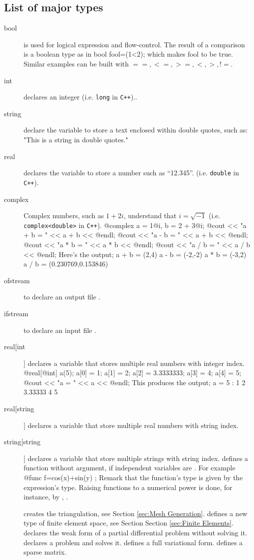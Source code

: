 \documentclass[a4paper,twoside,12pt]{book}
\def\refSec#1{Section \ref{sec:#1}}
\begin{document}
\subsection{List of major types}
\begin{description}
\item[bool]   is used for logical expression and flow-control.  The result of a
comparison is a boolean type as in
\bFF
bool fool=(1<2);
\eFF
which makes fool to be true.  Similar examples can be built with $==,<=,>=,<,>,!=$.
\item[int]
  declares an integer (i.e. \texttt{long} in \texttt{C++})..
\item[string] declare the variable to store
a text enclosed within double quotes, such as:
\bFF
"This is a string in double quotes."
\eFF
{}
\item[real] declares the variable to store a number such as ``12.345''.  (i.e. \texttt{double} in \texttt{C++}).
\item[complex]  Complex numbers, such as
$1+2i$, \freefempp understand that $i=\sqrt{-1}$ (i.e. \texttt{complex<double>} in \texttt{C++}).
\bFF
@complex a =  1@i, b = 2 + 3@i;
@cout << "a + b = " << a + b << @endl;
@cout << "a - b = " << a + b << @endl;
@cout << "a * b = " << a * b << @endl;
@cout << "a / b = " << a / b << @endl;
\eFF
Here's the output;
\bFF
a + b = (2,4)
a - b = (-2,-2)
a * b = (-3,2)
a / b = (0.230769,0.153846)
\eFF
\item[ofstream]  to declare an output file .
\item[ifstream]   to declare an input file .

\item[real[int]]  declares a variable that stores multiple
real numbers with integer index.
\bFF
@real[@int] a(5);
a[0] = 1; a[1] = 2; a[2] = 3.3333333; a[3] = 4; a[4] = 5;
@cout << "a = " << a  << @endl;
\eFF
This produces the output;
\bFF
a = 5   :
  1       2     3.33333   4       5
\eFF
\item[real[string]]  declares a variable that store multiple
real numbers with string index.
\item[string[string]]  declares a variable that store multiple
strings with string index.
\itemtt[func] defines a function without argument,
if independent variables are .
For example
\bFF
@func f=cos(x)+sin(y) ;
\eFF
{}
Remark that the function's type is given by the expression's type.
Raising functions to a numerical power is done, for instance, by
, .

\itemtt[mesh]  
creates the triangulation, see \refSec{Mesh Generation}.
\itemtt[fespace]
defines a new type of finite element space, see Section \refSec{Finite Elements}.
\itemtt[problem]  declares the weak form of a partial differential problem without solving it.
\itemtt[solve]  declares a problem and solves it.
\itemtt[varf]   defines a full variational form. 
\itemtt[matrix] defines a sparse matrix. 
\end{description}
\end{document}

